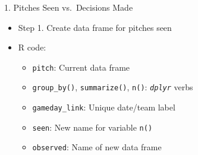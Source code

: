 \begin{frame}[fragile]{1. Pitches Seen vs.~Decisions Made}

\begin{itemize}
\tightlist
\item
  Step 1. Create data frame for pitches seen
\item
  R code:

  \begin{itemize}
  \tightlist
  \item
    \texttt{pitch}: Current data frame
  \item
    \texttt{group\_by()}, \texttt{summarize()}, \texttt{n()}:
    \emph{\texttt{dplyr}} verbs
  \item
    \texttt{gameday\_link}: Unique date/team label
  \item
    \texttt{seen}: New name for variable \texttt{n()}
  \item
    \texttt{observed}: Name of new data frame
  \end{itemize}
\end{itemize}

\footnotesize

\begin{Shaded}
\end{Shaded}

\end{frame}

